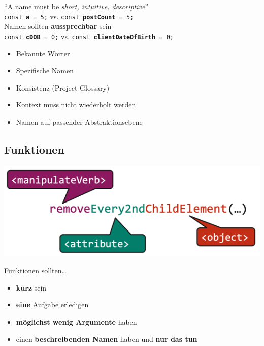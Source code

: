 \documentclass[a4paper, landscape, 8pt]{scrartcl}
\begin{document}
\begin{multicols*}{4}
        \enquote{A name must be \textit{short, intuitive, descriptive}} \\
        \texttt{const \textbf{a} = 5;} \> vs. \> \texttt{const \textbf{postCount} = 5;} \\

        Namen sollten \textbf{aussprechbar} sein \\
        \texttt{const \textbf{cDOB} = 0;} \> vs. \> \texttt{const \textbf{clientDateOfBirth} = 0;} \\

        \begin{itemize}
            \item Bekannte Wörter
            \item Spezifische Namen
            \item Konsistenz (Project Glossary)
            \item Kontext muss nicht wiederholt werden
            \item Namen auf passender Abstraktionsebene
        \end{itemize}
        
        \subsection{Funktionen}
        \includegraphics[scale=0.20]{graphic/18-name-funktionen}

        Funktionen sollten\ldots
        \begin{itemize}[label=...]
            \item \textbf{kurz} sein
            \item \textbf{eine} Aufgabe erledigen
            \item \textbf{möglichst wenig Argumente} haben
            \item einen \textbf{beschreibenden Namen} haben und \textbf{nur das tun}
        \end{itemize}


\end{multicols*}
\end{document}
